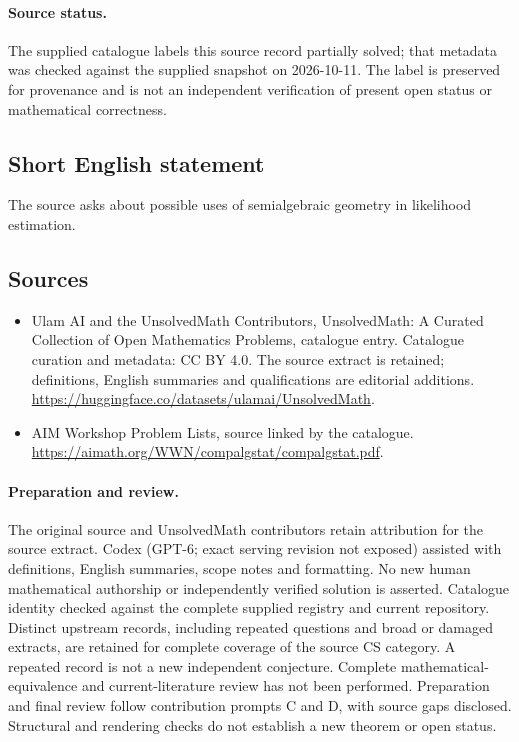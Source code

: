 \documentclass[11pt]{article}
\begin{document}
\paragraph{Source status.}
The supplied catalogue labels this source record partially solved; that metadata was checked against the supplied snapshot on 2026-10-11. The label is preserved for provenance and is not an independent verification of present open status or mathematical correctness.
\subsection{Short English statement}
The source asks about possible uses of semialgebraic geometry in likelihood estimation.
\subsection{Sources}
\begin{itemize}
\item[\hypertarget{source:statement:1}{S1}] Ulam AI and the UnsolvedMath Contributors, UnsolvedMath: A Curated Collection of Open Mathematics Problems, catalogue entry. Catalogue curation and metadata: CC BY 4.0. The source extract is retained; definitions, English summaries and qualifications are editorial additions.
\url{https://huggingface.co/datasets/ulamai/UnsolvedMath}.
\item[\hypertarget{source:statement:2}{S2}] AIM Workshop Problem Lists, source linked by the catalogue.
\url{https://aimath.org/WWN/compalgstat/compalgstat.pdf}.
\end{itemize}
\paragraph{Preparation and review.}
The original source and UnsolvedMath contributors retain attribution for the source extract. Codex (GPT-6; exact serving revision not exposed) assisted with definitions, English summaries, scope notes and formatting. No new human mathematical authorship or independently verified solution is asserted. Catalogue identity checked against the complete supplied registry and current repository. Distinct upstream records, including repeated questions and broad or damaged extracts, are retained for complete coverage of the source CS category. A repeated record is not a new independent conjecture. Complete mathematical-equivalence and current-literature review has not been performed. Preparation and final review follow contribution prompts C and D, with source gaps disclosed. Structural and rendering checks do not establish a new theorem or open status.
\label{end:statement}
\end{document}
